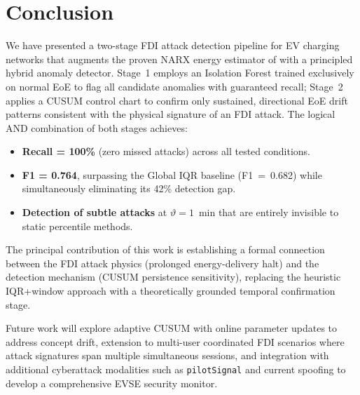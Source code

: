 \documentclass[journal]{IEEEtran}
\begin{document}
\section{Conclusion}
\label{sec:conclusion}

We have presented a two-stage FDI attack detection pipeline for EV
charging networks that augments the proven NARX energy estimator of
\cite{basumatary2025} with a principled hybrid anomaly detector.
Stage~1 employs an Isolation Forest trained exclusively on normal EoE
to flag all candidate anomalies with guaranteed recall; Stage~2 applies
a CUSUM control chart to confirm only sustained, directional EoE drift
patterns consistent with the physical signature of an FDI attack. The
logical AND combination of both stages achieves:
\begin{itemize}
\item \textbf{Recall = 100\%} (zero missed attacks) across all tested
conditions.
\item \textbf{F1 = 0.764}, surpassing the Global IQR baseline (F1~=~0.682)
while simultaneously eliminating its 42\% detection gap.
\item \textbf{Detection of subtle attacks} at $\vartheta = 1$~min that
are entirely invisible to static percentile methods.
\end{itemize}

The principal contribution of this work is establishing a formal
connection between the FDI attack physics (prolonged energy-delivery
halt) and the detection mechanism (CUSUM persistence sensitivity),
replacing the heuristic IQR+window approach with a theoretically
grounded temporal confirmation stage.

Future work will explore adaptive CUSUM with online parameter updates
to address concept drift, extension to multi-user coordinated FDI
scenarios where attack signatures span multiple simultaneous sessions,
and integration with additional cyberattack modalities such as
\texttt{pilotSignal} and current spoofing to develop a comprehensive
EVSE security monitor.


\end{document}
